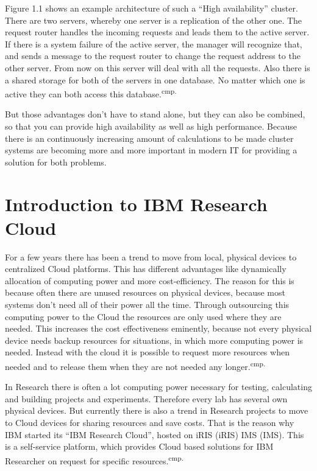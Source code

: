 Figure 1.1 shows an example architecture of such a ``High availability'' cluster. There are two servers, whereby one server is a replication of the other one. The request router handles the incoming requests and leads them to the active server. If there is a system failure of the active server, the manager will recognize that, and sends a message to the request router to change the request address to the other server. From now on this server will deal with all the requests. Also there is a shared storage for both of the servers in one database. No matter which one is active they can both access this database.\textsuperscript{cmp.\cite{4}}


But those advantages don't have to stand alone, but they can also be combined, so that you can provide high availability as well as high performance. Because there is an continuously increasing amount of calculations to be made cluster systems are becoming more and more important in modern IT for providing a solution for both problems.

\section{Introduction to IBM Research Cloud}

For a few years there has been a trend to move from local, physical devices to centralized Cloud platforms. This has different advantages like dynamically allocation of computing power and more cost-efficiency. The reason for this is because often there are unused resources on physical devices, because most systems don't need all of their power all the time. Through outsourcing this computing power to the Cloud the resources are only used where they are needed. This increases the cost effectiveness eminently, because not every physical device needs backup resources for situations, in which more computing power is needed. Instead with the cloud it is possible to request more resources when needed and to release them when they are not needed any longer.\textsuperscript{cmp.\cite{8}}


In Research there is often a lot computing power necessary for testing, calculating and building projects and experiments. Therefore every lab has several own physical devices. But currently there is also a trend in Research projects to move to Cloud devices for sharing resources and save costs. That is the reason why IBM started its ``IBM Research Cloud'', hosted on \acs{iRIS} (\acl{iRIS}) \acs{IMS} (\acl{IMS}). This is a self-service platform, which provides Cloud based solutions for IBM Researcher on request for specific resources.\textsuperscript{cmp.\cite{9}}

